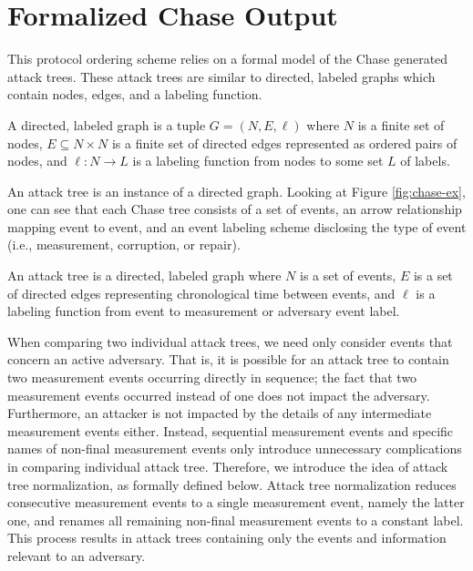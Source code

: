 \documentclass[runningheads]{llncs}
\theoremstyle{definition}
\begin{document}
\section{Formalized Chase Output}

This protocol ordering scheme relies on a formal model of the Chase generated attack trees. These attack trees are similar to directed, labeled graphs which contain nodes, edges, and a labeling function. 

\begin{definition}[Graph]
    A directed, labeled graph is a tuple $G = (N, E, \ell)$ where $N$ is a finite set of nodes, $E \subseteq N \times N$ is a finite set of directed edges represented as ordered pairs of nodes, and $\ell : N \rightarrow L$ is a labeling function from nodes to some set $L$ of labels. 
\end{definition}
 
An attack tree is an instance of a directed graph. Looking at Figure \ref{fig:chase-ex}, one can see that each Chase tree consists of a set of events, an arrow relationship mapping event to event, and an event labeling scheme disclosing the type of event (i.e., measurement, corruption, or repair).

\begin{definition}
    An attack tree is a directed, labeled graph where $N$ is a set of events, $E$ is a set of directed edges representing chronological time between events, and $\ell$ is a labeling function from event to measurement or adversary event label.
\end{definition}

When comparing two individual attack trees, we need only consider events that concern an active adversary. That is, it is possible for an attack tree to contain two measurement events occurring directly in sequence; the fact that two measurement events occurred instead of one does not impact the adversary. Furthermore, an attacker is not impacted by the details of any intermediate measurement events either. Instead, sequential measurement events and specific names of non-final measurement events only introduce unnecessary complications in comparing individual attack tree. Therefore, we introduce the idea of attack tree normalization, as formally defined below. Attack tree normalization reduces consecutive measurement events to a single measurement event, namely the latter one, and renames all remaining non-final measurement events to a constant label. This process results in attack trees containing only the events and information relevant to an adversary. 
\end{document}

